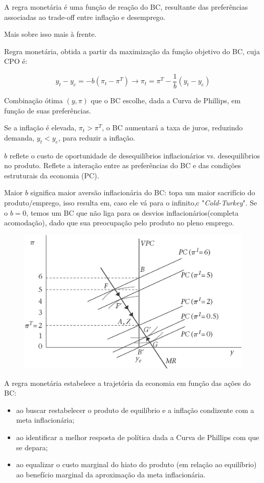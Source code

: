 \documentclass[a4paper,12pt]{article}[abntex2]
\begin{document}
A regra monetária é uma função de reação do BC, resultante das preferências associadas ao trade-off entre inflação e desemprego.

Mais sobre isso mais à frente.

Regra monetária, obtida a partir da maximização da função objetivo do BC, cuja CPO é:

\[
y_t - y_e = -b \left( \pi_t - \pi^T \right) \rightarrow \pi_t= \pi^T-\frac{1}{b}(y_t-y_e)
\]

Combinação ótima \((y, \pi)\) que o BC escolhe, dada a Curva de Phillips, em função de suas preferências.

Se a inflação é elevada, \(\pi_t > \pi^T\), o BC aumentará a taxa de juros, reduzindo demanda, \(y_t < y_e\), para reduzir a inflação.

\(b\) reflete o custo de oportunidade de desequilíbrios inflacionários vs. desequilíbrios no produto. Reflete a interação entre as preferências do BC e das condições estruturais da economia (PC).

Maior \(b\) significa maior aversão inflacionária do BC: topa um maior sacrifício do produto/emprego, isso resulta em, caso ele vá para o infinito,c "\textit{Cold-Turkey}". Se o \(b=0\), temos um BC que não liga para os desvios inflacionários(completa acomodação), dado que sua preocupação pelo produto no pleno emprego.


\begin{figure}[H]
    \centering
    \includegraphics[width=0.7\linewidth]{Imagens/a12i1.png}
\end{figure}

A regra monetária estabelece a trajetória da economia em função das ações do BC: \begin{itemize}
    \item ao buscar restabelecer o produto de equilíbrio e a inflação condizente com a meta inflacionária;
    \item ao identificar a melhor resposta de política dada a Curva de Phillips com que se depara;
    \item ao equalizar o custo marginal do hiato do produto (em relação ao equilíbrio) ao benefício marginal da aproximação da meta inflacionária.
\end{itemize}
\end{document}
